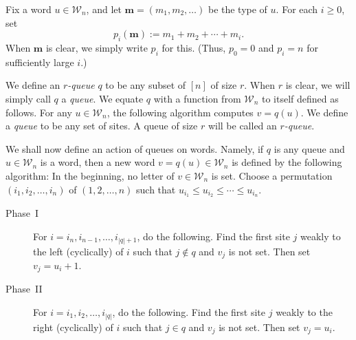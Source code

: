 \documentclass[reqno]{amsart}
\newcommand{\0}{\phantom{c}}
\newcommand{\mm}{\mathbf{m}}
\newcommand{\mcW}{\mathcal{W}}
\newenvironment{verlong}{}{}
\newenvironment{vershort}{}{}
\newcommand{\abs}[1]{\left| #1 \right|}
\newcommand{\tup}[1]{\left( #1 \right)}
\newcommand{\ive}[1]{\left[ #1 \right]}
\newcommand{\defn}[1]{{\color{darkred}\emph{#1}}} %
\theoremstyle{plain}
\theoremstyle{definition}
\numberwithin{equation}{section}
\newcommand{\travis}[1]{\todo[size=\tiny,color=blue!30]{#1 \\ \hfill --- Travis}}
\begin{document}
Fix a word $u \in \mcW_n$, and let $\mm = (m_1, m_2, \ldots)$ be the type of $u$.
For each $i \geq 0$, set
\begin{equation}
\label{eq:type_partial_sums}
p_i(\mm) := m_1 + m_2 + \cdots + m_i.
\end{equation}
When $\mm$ is clear, we simply write $p_i$ for this.
(Thus, $p_0 = 0$ and $p_i = n$ for sufficiently large $i$.)

\begin{vershort}
We define an \defn{$r$-queue} $q$ to be any subset of $\ive{n}$ of size $r$. When $r$ is clear, we will simply call $q$ a \defn{queue}.
We equate $q$ with a function from $\mcW_n$ to itself defined as follows.
For any $u \in \mcW_n$, the following algorithm computes $v = q(u)$.
\end{vershort}
\begin{verlong}
We define a \defn{queue} to be any set of sites.
A queue of size $r$ will be called an \defn{$r$-queue}.

We shall now define an action of queues on words.
Namely, if $q$ is any queue and $u \in \mcW_n$ is a word,
then a new word $v = q(u) \in \mcW_n$ is defined by the following algorithm:
\end{verlong}
In the beginning, no letter of $v \in \mcW_n$ is set.
Choose a permutation $\tup{i_1, i_2, \ldots, i_n}$ of $\tup{1, 2, \ldots, n}$
such that $u_{i_1} \leq u_{i_2} \leq \cdots \leq u_{i_n}$.

\begin{description}
\item[Phase~I]
  For $i = i_n, i_{n-1}, \ldots, i_{\abs{q}+1}$, do the following.
    Find the first site $j$ weakly to the left (cyclically) of $i$ such that $j \notin q$ and $v_j$ is not set.
    Then set $v_j = u_i + 1$.

\item[Phase~II]
  For $i = i_1, i_2, \ldots, i_{\abs{q}}$, do the following.
    Find the first site $j$ weakly to the right (cyclically) of $i$ such that $j \in q$ and $v_j$ is not set.
    Then set $v_j = u_i$.
\end{description}
\end{document}
